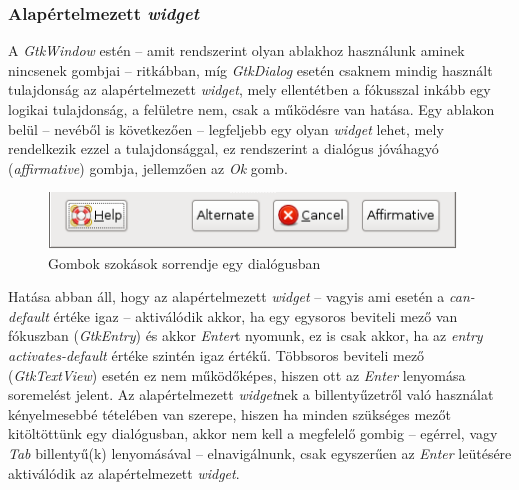 \subsubsection{Alapértelmezett \textit{widget}}

A \textit{GtkWindow} estén -- amit rendszerint olyan ablakhoz használunk aminek nincsenek gombjai -- ritkábban, míg \textit{GtkDialog} esetén csaknem mindig használt tulajdonság az alapértelmezett \textit{widget}, mely ellentétben a fókusszal inkább egy logikai tulajdonság, a felületre nem, csak a működésre van hatása. Egy ablakon belül -- nevéből is következően -- legfeljebb egy olyan \textit{widget} lehet, mely rendelkezik ezzel a tulajdonsággal, ez rendszerint a dialógus jóváhagyó (\textit{affirmative}) gombja, jellemzően az \textit{Ok} gomb.

\begin{figure}[H]
\begin{center}
\includegraphics[height=15mm]{images/button-affirmative.png}
\caption{Gombok szokások sorrendje egy dialógusban}
\end{center}
\end{figure}

Hatása abban áll, hogy az alapértelmezett \textit{widget} -- vagyis ami esetén a \textit{can-default} értéke igaz -- aktiválódik akkor, ha egy egysoros beviteli mező van fókuszban (\textit{GtkEntry}) és akkor \textit{Enter}t nyomunk, ez is csak akkor, ha az \textit{entry} \textit{activates-default} értéke szintén igaz értékű. Többsoros beviteli mező (\textit{GtkTextView}) esetén ez nem működőképes, hiszen ott az \textit{Enter} lenyomása soremelést jelent. Az alapértelmezett \textit{widget}nek a billentyűzetről való használat kényelmesebbé tételében van szerepe, hiszen ha minden szükséges mezőt kitöltöttünk egy dialógusban, akkor nem kell a megfelelő gombig -- egérrel, vagy \textit{Tab} billentyű(k) lenyomásával -- elnavigálnunk, csak egyszerűen az \textit{Enter} leütésére aktiválódik az alapértelmezett \textit{widget}.

